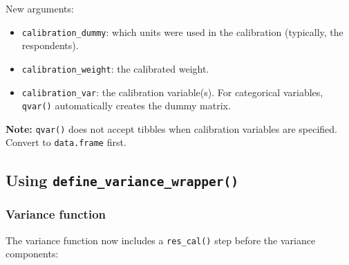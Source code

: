 \documentclass[
]{article}
\providecommand{\tightlist}{%
  \setlength{\itemsep}{0pt}\setlength{\parskip}{0pt}}
\begin{document}
New arguments:

\begin{itemize}
\tightlist
\item
  \texttt{calibration\_dummy}: which units were used in the calibration
  (typically, the respondents).
\item
  \texttt{calibration\_weight}: the calibrated weight.
\item
  \texttt{calibration\_var}: the calibration variable(s). For
  categorical variables, \texttt{qvar()} automatically creates the dummy
  matrix.
\end{itemize}

\textbf{Note:} \texttt{qvar()} does not accept tibbles when calibration
variables are specified. Convert to \texttt{data.frame} first.

\subsection{\texorpdfstring{Using
\texttt{define\_variance\_wrapper()}}{Using define\_variance\_wrapper()}}\label{using-define_variance_wrapper-2}

\subsubsection{Variance function}\label{variance-function-2}

The variance function now includes a \texttt{res\_cal()} step before the
variance components:
\end{document}
